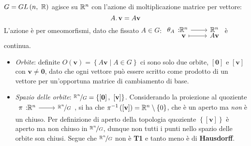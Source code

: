 \begin{example}
$G=GL\left(n,\ \mathbb{R}\right)$ agisce su $\mathbb{R}^n$ con l'azione di moltiplicazione matrice per vettore:
\begin{equation}
	A\ldotp \mathbf{v} = A\mathbf{v}
\end{equation}
L'azione è per omeomorfismi, dato che fissato $A\in G$: $\funztot{\theta_A}{\realset^n}{\realset^n}{\mathbf{v}}{A\mathbf{v}}$ è continua.
\begin{itemize}
	\item \textit{Orbite}: definite $O\left(\mathbf{v}\right)=\left\{A\mathbf{v}\mid A\in G\right\}$ ci sono solo due orbite, $\left[\mathbf{0}\right]$ e $\left[\mathbf{v}\right]$ con $\mathbf{v}\neq\mathbf{0}$, dato che ogni vettore può essere scritto come prodotto di un vettore per un'opportuna matrice di cambiamento di base.
	\item \textit{Spazio delle orbite}: $\nicefrac{\realset^n}{G}=\left\{\left[\mathbf{0}\right],\ \left[\mathbf{v}\right]\right\}$. Considerando la proiezione al quoziente $\funz{\pi}{\realset^n}{\nicefrac{\realset^n}{G}}$, si ha che $\pi^{-1}\left(\left[\mathbf{v}\right]\right)=\mathbb{R}^n\setminus\left\{0\right\}$, che è un aperto ma \textit{non} è un chiuso. Per definizione di aperto della topologia quoziente $\left\{\left[\mathbf{v}\right]\right\}$ è aperto ma non chiuso in $\nicefrac{\mathbb{R}^n}{G}$, dunque non tutti i punti nello spazio delle orbite son chiusi. Segue che $\nicefrac{\mathbb{R}^n}{G}$ non è \textbf{T1} e tanto meno è di \textbf{Hausdorff}.
\end{itemize}
\vspace{-3mm}
\end{example}

